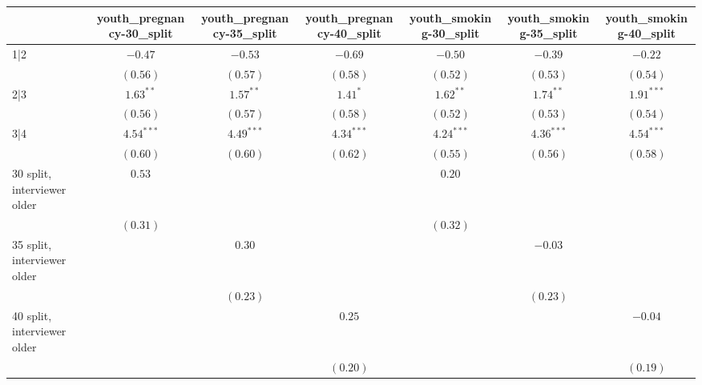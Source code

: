 
\usepackage{booktabs}
\usepackage{threeparttable}

\begin{table}
\begin{center}
\begin{threeparttable}
\begin{tabular}{l c c c c c c}
\toprule
 & youth_pregnancy-30_split & youth_pregnancy-35_split & youth_pregnancy-40_split & youth_smoking-30_split & youth_smoking-35_split & youth_smoking-40_split \\
\midrule
1|2                             & $-0.47$       & $-0.53$       & $-0.69$       & $-0.50$       & $-0.39$       & $-0.22$       \\
                                & $(0.56)$      & $(0.57)$      & $(0.58)$      & $(0.52)$      & $(0.53)$      & $(0.54)$      \\
2|3                             & $1.63^{**}$   & $1.57^{**}$   & $1.41^{*}$    & $1.62^{**}$   & $1.74^{**}$   & $1.91^{***}$  \\
                                & $(0.56)$      & $(0.57)$      & $(0.58)$      & $(0.52)$      & $(0.53)$      & $(0.54)$      \\
3|4                             & $4.54^{***}$  & $4.49^{***}$  & $4.34^{***}$  & $4.24^{***}$  & $4.36^{***}$  & $4.54^{***}$  \\
                                & $(0.60)$      & $(0.60)$      & $(0.62)$      & $(0.55)$      & $(0.56)$      & $(0.58)$      \\
30 split, interviewer older     & $0.53$        &               &               & $0.20$        &               &               \\
                                & $(0.31)$      &               &               & $(0.32)$      &               &               \\
35 split, interviewer older     &               & $0.30$        &               &               & $-0.03$       &               \\
                                &               & $(0.23)$      &               &               & $(0.23)$      &               \\
40 split, interviewer older     &               &               & $0.25$        &               &               & $-0.04$       \\
                                &               &               & $(0.20)$      &               &               & $(0.19)$      \\

\end{tabular}
\end{threeparttable}
\end{center}
\end{table}
